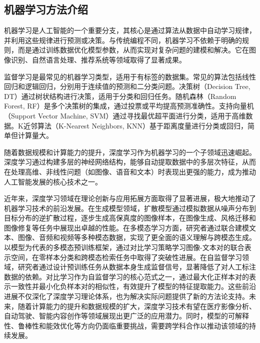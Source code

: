 \subsection{机器学习方法介绍}
机器学习是人工智能的一个重要分支，其核心是通过算法从数据中自动学习规律，并利用这些规律进行预测或决策。与传统编程不同，机器学习不依赖于明确的规则，而是通过训练数据优化模型参数，从而实现对复杂问题的建模和解决。它在图像识别、自然语言处理、推荐系统等领域取得了显著成果\cite{wang2023scientific}。

监督学习是最常见的机器学习类型，适用于有标签的数据集。常见的算法包括线性回归和逻辑回归，分别用于连续值的预测和二分类问题\cite{uesaka1973theory,liu2021self}。决策树（Decision Tree, DT）通过树状结构进行决策，适用于分类和回归任务\cite{quinlan1986induction}。随机森林（Random Forest, RF）是多个决策树的集成，通过投票或平均提高预测准确性\cite{breiman2001random}。支持向量机（Support Vector Machine, SVM）通过寻找最优超平面进行分类，适用于高维数据\cite{cortes1995support}。K近邻算法（K-Nearest Neighbors, KNN）基于距离度量进行分类或回归，简单但计算量大\cite{cover1967nearest}。

随着数据规模和计算能力的提升，深度学习作为机器学习的一个子领域迅速崛起。深度学习通过构建多层的神经网络结构，能够自动提取数据中的多层次特征，从而在处理高维、非线性问题（如图像、语音和文本）时表现出更强的能力，成为推动人工智能发展的核心技术之一\cite{wang2023scientific}。

近年来，深度学习领域在理论创新与应用拓展方面取得了显著进展，极大地推动了机器学习技术的前沿发展。在生成模型领域，扩散模型通过模拟数据从噪声分布到目标分布的逆扩散过程，逐步生成高保真度的图像样本，在图像生成、风格迁移和图像修复等任务中展现出卓越的性能\cite{yang2023diffusion}。在多模态学习方面，研究者通过联合建模文本、图像、音频和视频等多种模态数据，实现了更全面的语义理解与跨模态生成。以模型为代表的多模态预训练框架，通过对比学习策略学习图像-文本对的联合表示空间，在零样本分类和跨模态检索任务中取得了突破性进展\cite{xu2023multimodal}。在自监督学习领域，研究者通过设计预训练任务从数据本身生成监督信号，显著降低了对人工标注数据的依赖\cite{Xie2023}。对比学习作为自监督学习的核心范式之一，通过最大化正样本对的表示一致性并最小化负样本对的相似性，有效提升了模型的特征提取能力\cite{Zhu2024Vision}。这些前沿进展不仅深化了深度学习理论体系，也为解决实际问题提供了新的方法论支持。未来，随着计算能力的提升和数据规模的扩大，深度学习技术有望在医疗影像分析、自动驾驶、智能内容创作等领域展现出更广泛的应用潜力。同时，模型的可解释性、鲁棒性和能效优化等方向仍面临重要挑战，需要跨学科合作以推动该领域的持续发展\cite{wang2023scientific}。

